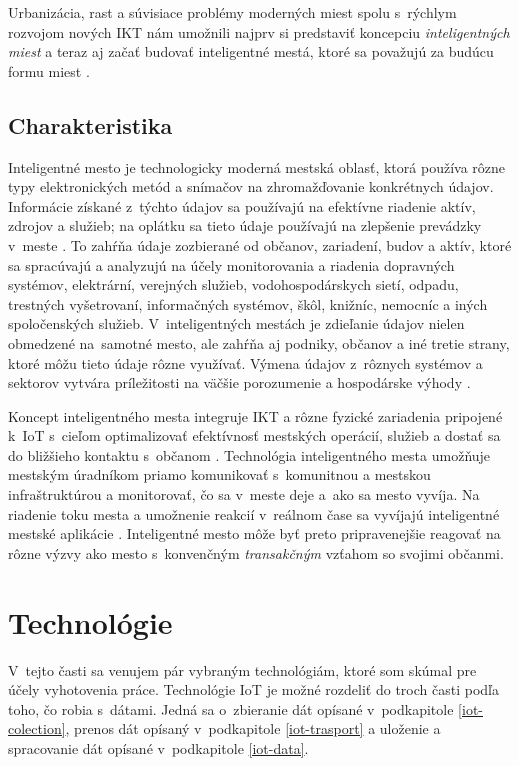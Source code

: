 Urbanizácia, rast a súvisiace problémy moderných miest spolu s~rýchlym rozvojom nových IKT nám umožnili najprv si predstaviť koncepciu \emph{inteligentných miest} a teraz aj začať budovať inteligentné mestá, ktoré sa považujú za budúcu formu miest \cite{Yin2015}.

\subsection{Charakteristika}
Inteligentné mesto je technologicky moderná mestská oblasť, ktorá používa rôzne typy elektronických metód a snímačov na zhromažďovanie konkrétnych údajov. 
Informácie získané z~týchto údajov sa používajú na efektívne riadenie aktív, zdrojov a služieb; na oplátku sa tieto údaje používajú na zlepšenie prevádzky v~meste \cite{goldsmith2021define}. 
To zahŕňa údaje zozbierané od občanov, zariadení, budov a aktív, ktoré sa spracúvajú a analyzujú na účely monitorovania a riadenia dopravných systémov, elektrární, verejných služieb, vodohospodárskych sietí, odpadu, trestných vyšetrovaní, informačných systémov, škôl, knižníc, nemocníc a iných spoločenských služieb. 
V~inteligentných mestách je zdieľanie údajov nielen obmedzené na~samotné mesto, ale zahŕňa aj podniky, občanov a iné tretie strany, ktoré môžu tieto údaje rôzne využívať. 
Výmena údajov z~rôznych systémov a sektorov vytvára príležitosti na väčšie porozumenie a hospodárske výhody \cite{paiho2022opportunities}.

Koncept inteligentného mesta integruje IKT a rôzne fyzické zariadenia pripojené k~IoT s~cieľom optimalizovať efektívnosť mestských operácií, služieb a dostať sa do bližšieho kontaktu s~občanom \cite{gracia2018sustainable}. 
Technológia inteligentného mesta umožňuje mestským úradníkom priamo komunikovať s~komunitnou a mestskou infraštruktúrou a monitorovať, čo sa v~meste deje a~ako sa mesto vyvíja. 
Na riadenie toku mesta a umožnenie reakcií v~reálnom čase sa vyvíjajú inteligentné mestské aplikácie \cite{komninos2013makes}. 
Inteligentné mesto môže byť preto pripravenejšie reagovať na rôzne výzvy ako mesto s~konvenčným \emph{transakčným} vzťahom so svojimi občanmi.

\section{Technológie}\label{Iot-technology}
V~tejto časti sa venujem pár vybraným technológiám, ktoré som skúmal pre účely vyhotovenia práce. 
Technológie IoT je možné rozdeliť do troch časti podľa toho, čo robia s~dátami. 
Jedná sa o~zbieranie dát opísané v~podkapitole \ref{iot-colection}, prenos dát opísaný v~podkapitole \ref{iot-trasport} a uloženie a spracovanie dát opísané v~podkapitole \ref{iot-data}.


